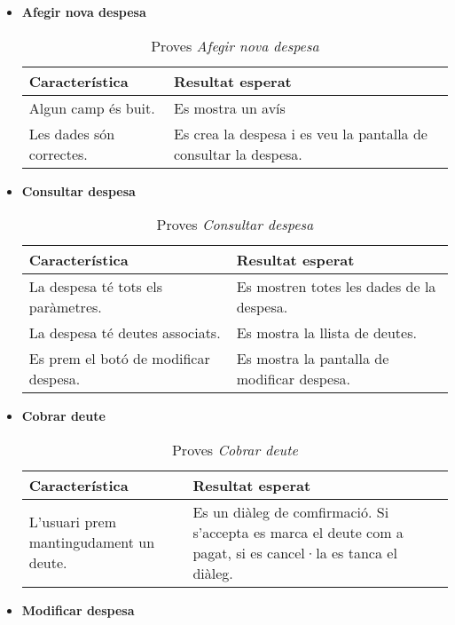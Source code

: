 \begin{itemize}
\item{}\textbf{Afegir nova despesa}

\begin{table}[!h]
\centering
\begin{tabular}{|T|T|}
\hline
\textbf{Característica}  & \textbf{Resultat esperat} \\\hline
Algun camp és buit. & Es mostra un avís\\\hline
Les dades són correctes. & Es crea la despesa i es veu la pantalla de consultar la despesa.\\\hline
\end{tabular}
\label{}
\caption{Proves \textit{Afegir nova despesa}}
\end{table}

\clearpage

\item{}\textbf{Consultar despesa}

\begin{table}[!h]
\centering
\begin{tabular}{|T|T|}
\hline
\textbf{Característica}  & \textbf{Resultat esperat} \\\hline
La despesa té tots els paràmetres. & Es mostren totes les dades de la despesa.\\\hline
La despesa té deutes associats. & Es mostra la llista de deutes.\\\hline
Es prem el botó de modificar despesa. & Es mostra la pantalla de modificar despesa.\\\hline
\end{tabular}
\label{}
\caption{Proves \textit{Consultar despesa}}
\end{table}


\item{}\textbf{Cobrar deute}

\begin{table}[!h]
\centering
\begin{tabular}{|T|T|}
\hline
\textbf{Característica}  & \textbf{Resultat esperat} \\\hline
L'usuari prem mantingudament un deute. & Es un diàleg de comfirmació. Si s'accepta es marca el deute com a pagat, si es cancel·la es tanca el diàleg.\\\hline
\end{tabular}
\label{}
\caption{Proves \textit{Cobrar deute}}
\end{table}

\item{}\textbf{Modificar despesa}


\end{itemize}
